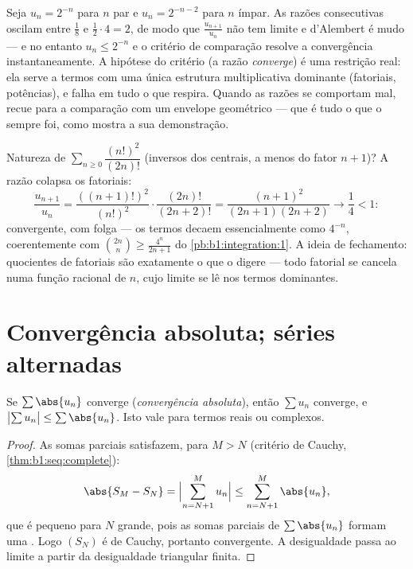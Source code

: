 \begin{example}\label{ex:b1:series:rationotnecessary}
Seja $u_n = 2^{-n}$ para $n$ par e $u_n = 2^{-n-2}$ para $n$ ímpar. As razões
consecutivas oscilam entre $\frac{1}{8}$ e $\frac12\cdot4 = 2$, de modo que $\frac{u_{n+1}}{u_n}$ não tem
limite e d'Alembert é mudo --- e no entanto $u_n \leq 2^{-n}$ e o critério de
comparação resolve a convergência instantaneamente. A hipótese do
critério (a razão \emph{converge}) é uma restrição real: ela serve a
termos com uma única estrutura multiplicativa dominante (fatoriais,
potências), e falha em tudo o que respira. Quando as razões se
comportam mal, recue para a comparação com um envelope geométrico ---
que é tudo o que o  sempre foi, como mostra a sua
demonstração.
\end{example}

\begin{example}\label{ex:b1:series:ratiobinom}
Natureza de $\sum_{n\geq0} \dfrac{(n!)^2}{(2n)!}$ (inversos dos  centrais, a
menos do fator $n + 1$)? A razão colapsa os fatoriais:
\[
\frac{u_{n+1}}{u_n}
= \frac{((n+1)!)^2}{(n!)^2}\cdot\frac{(2n)!}{(2n+2)!}
= \frac{(n+1)^2}{(2n+1)(2n+2)}
\longrightarrow \frac14 < 1 :
\]
convergente, com folga --- os termos decaem essencialmente
como $4^{-n}$, coerentemente com $\binom{2n}{n} \geq
\frac{4^n}{2n+1}$ do \cref{pb:b1:integration:1}. A ideia de
fechamento: quocientes de fatoriais são exatamente o que o  digere --- todo fatorial se cancela numa função racional de
$n$, cujo limite se lê nos termos dominantes.
\end{example}

\section{Convergência absoluta; séries alternadas}

\begin{theorem}\label{thm:b1:series:absolute}
Se $\sum \abs{u_n}$ converge (\emph{convergência
absoluta}), então $\sum u_n$ converge,
e $\bigl|\sum u_n\bigr| \leq \sum \abs{u_n}$. Isto vale para termos reais
ou complexos.
\end{theorem}

\begin{proof}
As somas parciais satisfazem, para $M > N$ (critério de Cauchy,
\cref{thm:b1:seq:complete}):
\[
\abs{S_M - S_N} = \Bigl| \sum_{n=N+1}^{M} u_n \Bigr|
\leq \sum_{n=N+1}^{M} \abs{u_n},
\]
que é pequeno para $N$ grande, pois as somas parciais de $\sum\abs{u_n}$
formam uma . Logo $(S_N)$ é de Cauchy, portanto
convergente. A desigualdade passa ao limite a partir da desigualdade
triangular finita.
\end{proof}

